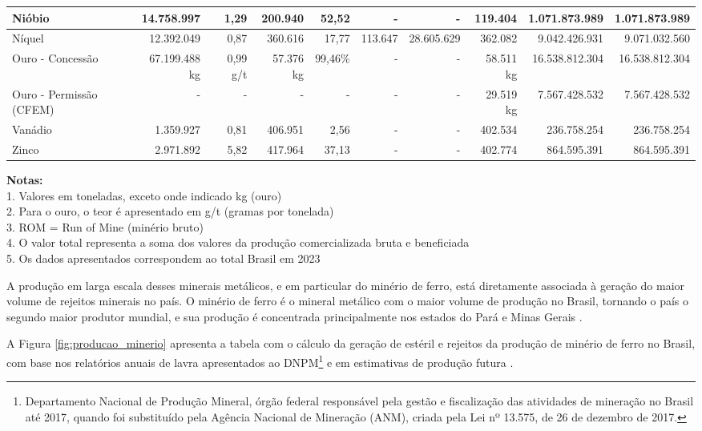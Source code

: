 \begin{table}[ht]
{\begin{tabular}{|l|rr|rr|rr|rr|r|}
    \hline
    Nióbio & 14.758.997 & 1,29 & 200.940 & 52,52 & - & - & 119.404 & 1.071.873.989 & 1.071.873.989 \\
    \hline
    Níquel & 12.392.049 & 0,87 & 360.616 & 17,77 & 113.647 & 28.605.629 & 362.082 & 9.042.426.931 & 9.071.032.560 \\
    \hline
    Ouro - Concessão & 67.199.488 kg & 0,99 g/t & 57.376 kg & 99,46\% & - & - & 58.511 kg & 16.538.812.304 & 16.538.812.304 \\
    \hline
    Ouro - Permissão (CFEM) & - & - & - & - & - & - & 29.519 kg & 7.567.428.532 & 7.567.428.532 \\
    \hline
    Vanádio & 1.359.927 & 0,81 & 406.951 & 2,56 & - & - & 402.534 & 236.758.254 & 236.758.254 \\
    \hline
    Zinco & 2.971.892 & 5,82 & 417.964 & 37,13 & - & - & 402.774 & 864.595.391 & 864.595.391 \\
    \hline
\end{tabular}
}
\label{tab:mineral-production}
\end{table}

\vspace{0.5cm}
\textbf{Notas:}\\
1. Valores em toneladas, exceto onde indicado kg (ouro)\\
2. Para o ouro, o teor é apresentado em g/t (gramas por tonelada)\\
3. ROM = Run of Mine (minério bruto)\\
4. O valor total representa a soma dos valores da produção comercializada bruta e beneficiada\\
5. Os dados apresentados correspondem ao total Brasil em 2023

A produção em larga escala desses minerais metálicos, e em particular do minério de ferro, está diretamente associada à geração do maior volume de rejeitos minerais no país. O minério de ferro é o mineral metálico com o maior volume de produção no Brasil, tornando o país o segundo maior produtor mundial, e sua produção é concentrada principalmente nos estados do Pará e Minas Gerais \cite{freire2020, pmb2023}.

A Figura \ref{fig:producao_minerio} apresenta a tabela com o cálculo da geração de estéril e rejeitos da produção de minério de ferro no Brasil, com base nos relatórios anuais de lavra apresentados ao DNPM\footnote{Departamento Nacional de Produção Mineral, órgão federal responsável pela gestão e fiscalização das atividades de mineração no Brasil até 2017, quando foi substituído pela Agência Nacional de Mineração (ANM), criada pela Lei nº 13.575, de 26 de dezembro de 2017.} e em estimativas de produção futura \cite{carvalho2018}.

